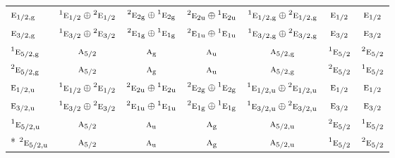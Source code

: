 \documentclass[10pt,a4paper]{article}
\numberwithin{equation}{section}
\newcommand{\irr}[1]{\text{\normalfont\scshape #1}}
\newcommand{\conjpair}[1]{{}^{#1}}
\newcommand{\ptag}[1]{\mathrm{#1}}
\begin{document}
{\begin{longtable}{@{}lcccccc@{}}
$\irr{e}_{1/2,\ptag{g}}$ & $\conjpair{1}\irr{e}_{1/2}\oplus \conjpair{2}\irr{e}_{1/2}$ & $\conjpair{2}\irr{e}_{2\ptag{g}}\oplus \conjpair{1}\irr{e}_{2\ptag{g}}$ & $\conjpair{2}\irr{e}_{2\ptag{u}}\oplus \conjpair{1}\irr{e}_{2\ptag{u}}$ & $\conjpair{1}\irr{e}_{1/2,\ptag{g}}\oplus \conjpair{2}\irr{e}_{1/2,\ptag{g}}$ & $\irr{e}_{1/2}$ & $\irr{e}_{1/2}$\\
$\irr{e}_{3/2,\ptag{g}}$ & $\conjpair{1}\irr{e}_{3/2}\oplus \conjpair{2}\irr{e}_{3/2}$ & $\conjpair{2}\irr{e}_{1\ptag{g}}\oplus \conjpair{1}\irr{e}_{1\ptag{g}}$ & $\conjpair{2}\irr{e}_{1\ptag{u}}\oplus \conjpair{1}\irr{e}_{1\ptag{u}}$ & $\conjpair{1}\irr{e}_{3/2,\ptag{g}}\oplus \conjpair{2}\irr{e}_{3/2,\ptag{g}}$ & $\irr{e}_{3/2}$ & $\irr{e}_{3/2}$\\
$\conjpair{1}\irr{e}_{5/2,\ptag{g}}$ & $\irr{a}_{5/2}$ & $\irr{a}_{\ptag{g}}$ & $\irr{a}_{\ptag{u}}$ & $\irr{a}_{5/2,\ptag{g}}$ & $\conjpair{1}\irr{e}_{5/2}$ & $\conjpair{2}\irr{e}_{5/2}$\\
$\conjpair{2}\irr{e}_{5/2,\ptag{g}}$ & $\irr{a}_{5/2}$ & $\irr{a}_{\ptag{g}}$ & $\irr{a}_{\ptag{u}}$ & $\irr{a}_{5/2,\ptag{g}}$ & $\conjpair{2}\irr{e}_{5/2}$ & $\conjpair{1}\irr{e}_{5/2}$\\
$\irr{e}_{1/2,\ptag{u}}$ & $\conjpair{1}\irr{e}_{1/2}\oplus \conjpair{2}\irr{e}_{1/2}$ & $\conjpair{2}\irr{e}_{2\ptag{u}}\oplus \conjpair{1}\irr{e}_{2\ptag{u}}$ & $\conjpair{2}\irr{e}_{2\ptag{g}}\oplus \conjpair{1}\irr{e}_{2\ptag{g}}$ & $\conjpair{1}\irr{e}_{1/2,\ptag{u}}\oplus \conjpair{2}\irr{e}_{1/2,\ptag{u}}$ & $\irr{e}_{1/2}$ & $\irr{e}_{1/2}$\\
$\irr{e}_{3/2,\ptag{u}}$ & $\conjpair{1}\irr{e}_{3/2}\oplus \conjpair{2}\irr{e}_{3/2}$ & $\conjpair{2}\irr{e}_{1\ptag{u}}\oplus \conjpair{1}\irr{e}_{1\ptag{u}}$ & $\conjpair{2}\irr{e}_{1\ptag{g}}\oplus \conjpair{1}\irr{e}_{1\ptag{g}}$ & $\conjpair{1}\irr{e}_{3/2,\ptag{u}}\oplus \conjpair{2}\irr{e}_{3/2,\ptag{u}}$ & $\irr{e}_{3/2}$ & $\irr{e}_{3/2}$\\
$\conjpair{1}\irr{e}_{5/2,\ptag{u}}$ & $\irr{a}_{5/2}$ & $\irr{a}_{\ptag{u}}$ & $\irr{a}_{\ptag{g}}$ & $\irr{a}_{5/2,\ptag{u}}$ & $\conjpair{2}\irr{e}_{5/2}$ & $\conjpair{1}\irr{e}_{5/2}$\\*
$\conjpair{2}\irr{e}_{5/2,\ptag{u}}$ & $\irr{a}_{5/2}$ & $\irr{a}_{\ptag{u}}$ & $\irr{a}_{\ptag{g}}$ & $\irr{a}_{5/2,\ptag{u}}$ & $\conjpair{1}\irr{e}_{5/2}$ & $\conjpair{2}\irr{e}_{5/2}$\\
\bottomrule\end{longtable}}
\end{document}
